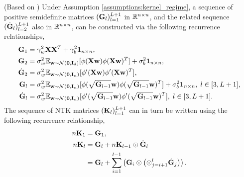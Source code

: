 \begin{lemma}\label{lemma:ntk_exp1}
(Based on \citealt[Lemma 3.1]{nguyen_tight_bounds}) Under Assumption \ref{assumptions:kernel_regime}, a sequence of positive semidefinite matrices $(\mathbf{G}_{l})_{l=1}^{L+1}$ in $\mathbb{R}^{n \times n}$, and the related sequence $(\dot{\mathbf{G}}_{l})_{l=2}^{L+1}$ also in $\mathbb{R}^{n \times n}$, can be constructed via the following recurrence relationships,
\begin{equation}\label{eq:recurrence_G_matrices}
\begin{aligned}
\mathbf{G}_{1} &= \gamma_w^2\mathbf{X} \mathbf{X}^T+\gamma_b^2 \textbf{1}_{n \times n},\\
\mathbf{G}_{2}  &= \sigma_w^2 \mathbb{E}_{\mathbf w \sim \mathcal{N}(\textbf{0}, \textbf{I}_d)}[\phi(\mathbf{X} \mathbf w) \phi(\mathbf{X} \mathbf w)^T] + \sigma_b^2 \textbf{1}_{n \times n},\\
\dot{\mathbf{G}}_{2} &= \sigma_w^2 \mathbb{E}_{\mathbf w \sim \mathcal{N}(\textbf{0}, \textbf{I}_n)}[\phi'(\mathbf{X} \mathbf w) \phi'(\mathbf{X} \mathbf w)^T],\\
\mathbf{G}_{l}  &= \sigma_w^2 \mathbb{E}_{\mathbf w \sim \mathcal{N}(\textbf{0}, \textbf{I}_n)}[\phi(\sqrt{\mathbf{G}_{l-1}} \mathbf w) \phi(\sqrt{\mathbf{G}_{l-1}} \mathbf w)^T] + \sigma_b^2 \textbf{1}_{n \times n}, \; l \in [3,L+1],\\
\dot{\mathbf{G}}_{l} &= \sigma_w^2 \mathbb{E}_{\mathbf w \sim \mathcal{N}(\textbf{0}, \textbf{I}_n)}[\phi'(\sqrt{\mathbf{G}_{l-1}} \mathbf w) \phi'(\sqrt{\mathbf{G}_{l-1}} \mathbf w)^T], \; l \in [3,L+1].
\end{aligned}
\end{equation}
The sequence of NTK matrices $(\mathbf{K}_{l})_{l=1}^{L+1}$ can in turn be written using the following recurrence relationship,
\begin{equation}\label{eq:reccurence_NTK_matrices}
\begin{aligned}
n\mathbf{K}_{1} &= \mathbf{G}_{1},\\
n\mathbf{K}_{l} &=\mathbf{G}_{l} + n\mathbf{K}_{l-1}\odot \dot{\mathbf{G}}_{l} \\
&= \mathbf{G}_{l} + \sum_{i=1}^{l-1} \left( \mathbf{G}_{i} \odot\left( \odot_{j = i+1}^{l} \dot{\mathbf{G}}_{j}\right)\right).
\end{aligned}
\end{equation}
\end{lemma}

